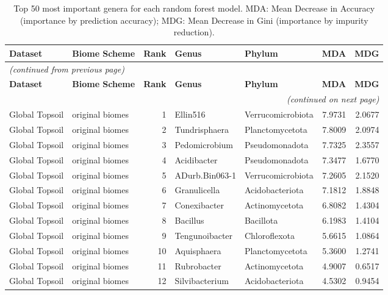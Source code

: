 \documentclass[12pt, oneside]{report}
\begin{document}
\begin{center}
\small
\begin{longtable}{llrp{2.7cm}p{2.2cm}rr}
\caption[Feature importance top 50]{Top 50 most important genera for each random forest model. MDA: Mean Decrease in Accuracy (importance by prediction accuracy); MDG: Mean Decrease in Gini (importance by impurity reduction).}
\label{tab:supp6b} \\
\toprule
\textbf{Dataset} & \textbf{Biome Scheme} & \textbf{Rank} & \textbf{Genus} & \textbf{Phylum} & \textbf{MDA} & \textbf{MDG} \\
\midrule
\endfirsthead
\multicolumn{7}{l}{\small\itshape(continued from previous page)} \\[2pt]
\toprule
\textbf{Dataset} & \textbf{Biome Scheme} & \textbf{Rank} & \textbf{Genus} & \textbf{Phylum} & \textbf{MDA} & \textbf{MDG} \\
\midrule
\endhead
\midrule\multicolumn{7}{r}{\small\itshape(continued on next page)} \\
\endfoot
\bottomrule
\endlastfoot
Global Topsoil & original biomes & 1 & Ellin516 & Verrucomicrobiota & 7.9731 & 2.0677 \\
Global Topsoil & original biomes & 2 & Tundrisphaera & Planctomycetota & 7.8009 & 2.0974 \\
Global Topsoil & original biomes & 3 & Pedomicrobium & Pseudomonadota & 7.7325 & 2.3557 \\
Global Topsoil & original biomes & 4 & Acidibacter & Pseudomonadota & 7.3477 & 1.6770 \\
Global Topsoil & original biomes & 5 & ADurb.Bin063-1 & Verrucomicrobiota & 7.2605 & 2.1520 \\
Global Topsoil & original biomes & 6 & Granulicella & Acidobacteriota & 7.1812 & 1.8848 \\
Global Topsoil & original biomes & 7 & Conexibacter & Actinomycetota & 6.8082 & 1.4304 \\
Global Topsoil & original biomes & 8 & Bacillus & Bacillota & 6.1983 & 1.4104 \\
Global Topsoil & original biomes & 9 & Tengunoibacter & Chloroflexota & 5.6615 & 1.0864 \\
Global Topsoil & original biomes & 10 & Aquisphaera & Planctomycetota & 5.3600 & 1.2741 \\
Global Topsoil & original biomes & 11 & Rubrobacter & Actinomycetota & 4.9007 & 0.6517 \\
Global Topsoil & original biomes & 12 & Silvibacterium & Acidobacteriota & 4.5302 & 0.9454 \\

\end{longtable}
\end{center}
\end{document}
